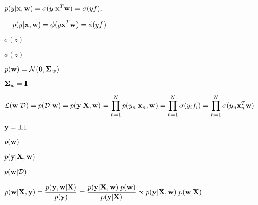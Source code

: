 \documentclass{article}
\def\lthtmlcheckvsize{\ifdim\ht\sizebox<\vsize 
  \ifdim\wd\sizebox<\hsize\expandafter\hfill\fi \expandafter\vfill
  \else\expandafter\vss\fi}%
\begin{document}
{\newpage\clearpage
{}%
$\displaystyle p(y|{\bf x},{\bf w})=\sigma(y\;{\bf x}^T{\bf w})=\sigma(yf),
\;\;\;\;$%
\lthtmlindisplaymathZ
\lthtmlcheckvsize\clearpage}

{\newpage\clearpage
{}%
$\displaystyle \;\;\;\;
p(y|{\bf x},{\bf w})=\phi(y{\bf x}^T{\bf w})=\phi(yf)$%
\lthtmlindisplaymathZ
\lthtmlcheckvsize\clearpage}

{\newpage\clearpage
{}%
$ \sigma(z)$%
\lthtmlindisplaymathZ
\lthtmlcheckvsize\clearpage}

{\newpage\clearpage
{}%
$ \phi(z)$%
\lthtmlindisplaymathZ
\lthtmlcheckvsize\clearpage}

{\newpage\clearpage
{}%
$ p({\bf w})={\cal N}({\bf0},{\bf\Sigma}_w)$%
\lthtmlindisplaymathZ
\lthtmlcheckvsize\clearpage}

{\newpage\clearpage
{}%
$ {\bf\Sigma}_w={\bf I}$%
\lthtmlindisplaymathZ
\lthtmlcheckvsize\clearpage}

{\newpage\clearpage
{}%
$\displaystyle {\cal L}({\bf w}|{\cal D})=p({\cal D}|{\bf w})
=p({\bf y}|{\bf X},{\bf w})=\prod_{n=1}^N p(y_n|{\bf x}_n,{\bf w})
=\prod_{n=1}^N \sigma(y_if_i)=\prod_{n=1}^N \sigma(y_n{\bf x}_n^T{\bf w})$%
\lthtmlindisplaymathZ
\lthtmlcheckvsize\clearpage}

{\newpage\clearpage
{}%
$ {\bf y}=\pm 1$%
\lthtmlindisplaymathZ
\lthtmlcheckvsize\clearpage}

{\newpage\clearpage
{}%
$ p({\bf w})$%
\lthtmlindisplaymathZ
\lthtmlcheckvsize\clearpage}

{\newpage\clearpage
{}%
$ p({\bf y}|{\bf X},{\bf w})$%
\lthtmlindisplaymathZ
\lthtmlcheckvsize\clearpage}

{\newpage\clearpage
{}%
$\displaystyle p({\bf w}|{\cal D})$%
\lthtmlindisplaymathZ
\lthtmlcheckvsize\clearpage}

{\newpage\clearpage
{}%
$\displaystyle p({\bf w}|{\bf X},{\bf y})
=\frac{p({\bf y},{\bf w}|{\bf X})}{p({\bf y})}
=\frac{p({\bf y}|{\bf X},{\bf w})\; p({\bf w})}{p({\bf y}|{\bf X})}
\propto p({\bf y}|{\bf X},{\bf w})\;p({\bf w}|{\bf X})$%
\lthtmlindisplaymathZ
\lthtmlcheckvsize\clearpage}
\end{document}
